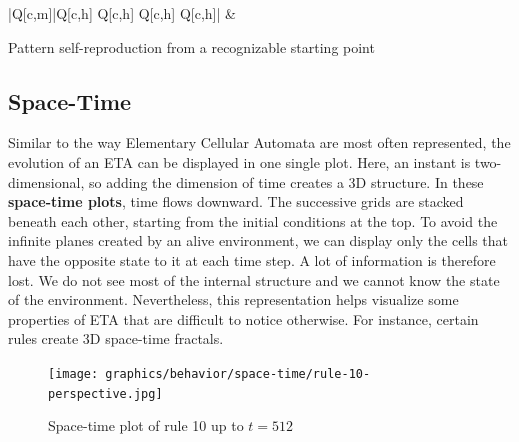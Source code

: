 \documentclass{article}
\begin{document}
\begin{table}[H]
\begin{tblr}{|Q[c,m]|Q[c,h] Q[c,h] Q[c,h] Q[c,h]|}
             &
             \vspace{0pt} \\ 
        \hline
    \end{tblr}
    \caption{Pattern self-reproduction from a recognizable starting point}
    \label{tab:my_label}
\end{table}

\pagebreak
\subsection{Space-Time} \label{space-time}
Similar to the way Elementary Cellular Automata \cite{wolfram2002new, weisstein2002elementary} are most often represented, the evolution of an ETA can be displayed in one single plot. Here, an instant is two-dimensional, so adding the dimension of time creates a 3D structure. In these \textbf{space-time plots}, time flows downward. The successive grids are stacked beneath each other, starting from the initial conditions at the top. To avoid the infinite planes created by an alive environment, we can display only the cells that have the opposite state to it at each time step. A lot of information is therefore lost. We do not see most of the internal structure and we cannot know the state of the environment. Nevertheless, this representation helps visualize some properties of ETA that are difficult to notice otherwise. For instance, certain rules create 3D space-time fractals.

\vspace{1cm}

\begin{figure}[H]
    \centering
    \texttt{[image: graphics/behavior/space-time/rule-10-perspective.jpg]}
    \caption{Space-time plot of rule 10 up to $t=512$}
    \label{fig:rule-10-perspective}
\end{figure}
\end{document}
